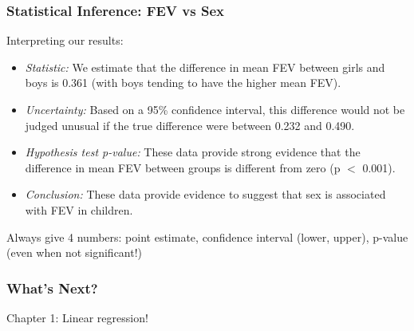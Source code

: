 \documentclass[12pt, 
hyperref={colorlinks=true, linkcolor=blue, urlcolor=cyan}]{beamer}
\begin{document}
\begin{frame}
\frametitle{Statistical Inference: FEV vs Sex}

Interpreting our results:\vspace{-0.3cm}

\begin{itemize}
\item \textit{Statistic:} We estimate that the difference in mean FEV between girls and boys is 0.361 (with boys tending to have the higher mean FEV). 
\item \textit{Uncertainty:} Based on a 95\% confidence interval, this difference would not be judged unusual if the true difference were between 0.232 and 0.490.
\item \textit{Hypothesis test p-value:} These data provide strong evidence that the difference in mean FEV between groups is different from zero (p $<$ 0.001).
\item \textit{Conclusion:} These data provide evidence to suggest that sex is associated with FEV in children. \pause
\end{itemize}

\vspace{-0.3cm} \color{blue} Always give 4 numbers: \color{black} point estimate, confidence interval (lower, upper), p-value (even when not significant!)

\end{frame}


\begin{frame}
\frametitle{What's Next?}
 
\center \color{blue} \begin{LARGE} Chapter 1: Linear regression! \end{LARGE} \color{black}

\end{frame}
\end{document}
